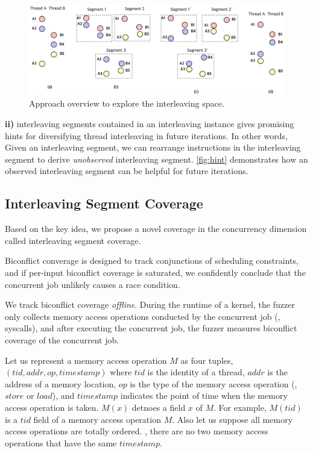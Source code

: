 \begin{figure}[t]
  \includegraphics[width=0.9\linewidth]{fig/intuition.pdf}
  \caption{Approach overview to explore the interleaving
    space.}
  \label{fig:hint}
\end{figure}
%
\textbf{ii)} interleaving segments contained in an interleaving
instance gives promising hints for diversifying thread interleaving in
future iterations.
%
In other words, Given an interleaving segment, we can rearrange
instructions in the interleaving segment to derive \textit{unobserved}
interleaving segment.
%
\autoref{fig:hint} demonstrates how an observed interleaving segment
can be helpful for future iterations.
%
\dr{}



\subsection{Interleaving Segment Coverage}
\label{ss:coverage}

Based on the key idea, we propose a novel coverage in the concurrency
dimension called interleaving segment coverage.
%



\newcommand{\mutable}{mutable edge\xspace}
\newcommand{\mutables}{mutable edges\xspace}
\newcommand{\immutable}{immutable edge\xspace}
\newcommand{\immutables}{immutable edges\xspace}
%
Biconflict converage is designed to track conjunctions of scheduling
constraints, and if per-input biconflict coverage is saturated, we
confidently conclude that the concurrent job unlikely causes a race
condition.

We track biconflict coverage \textit{offline}. During the runtime of a
kernel, the fuzzer only collects memory access operations conducted by
the concurrent job (\eg, syscalls), and after executing the concurrent
job, the fuzzer measures biconflict coverage of the concurrent job.

%
Let us represent a memory access operation $M$ as four tuples,
$(tid, addr, op, timestamp)$ where $tid$ is the identity of a thread,
$addr$ is the address of a memory location, $op$ is the type of the
memory access operation (\ie, $store$ or $load$), and $timestamp$
indicates the point of time when the memory access operation is taken.
%
$M(x)$ detnoes a field $x$ of $M$. For example, $M(tid)$ is a $tid$
field of a memory access operation $M$.
%
Also let us suppose all memory access operations are totally
ordered. \ie, there are no two memory access operations that have the
same $timestamp$.

